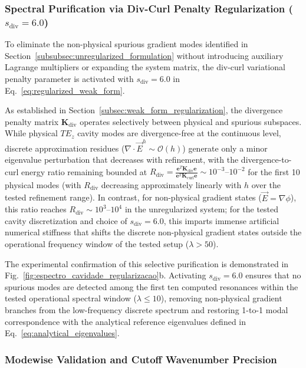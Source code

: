 \documentclass[preprint,12pt]{elsarticle}
\begin{document}
\subsubsection{Spectral Purification via Div-Curl Penalty Regularization (\texorpdfstring{$s_{\mathrm{div}} = 6.0$}{s(div) = 6.0})}
\label{subsubsec:regularized_formulation}

To eliminate the non-physical spurious gradient modes identified in Section~\ref{subsubsec:unregularized_formulation} without introducing auxiliary Lagrange multipliers or expanding the system matrix, the div-curl variational penalty parameter is activated with $s_{\mathrm{div}} = 6.0$ in Eq.~\eqref{eq:regularized_weak_form}.

As established in Section~\ref{subsec:weak_form_regularization}, the divergence penalty matrix $\mathbf{K}_{\mathrm{div}}$ operates selectively between physical and spurious subspaces. While physical $TE_z$ cavity modes are divergence-free at the continuous level, discrete approximation residues ($\nabla \cdot \vec{E}^h \sim \mathcal{O}(h)$) generate only a minor eigenvalue perturbation that decreases with refinement, with the divergence-to-curl energy ratio remaining bounded at $R_{\mathrm{div}} = \frac{\mathbf{e}^T \mathbf{K}_{\mathrm{div}} \mathbf{e}}{\mathbf{e}^T \mathbf{K}_{\mathrm{curl}} \mathbf{e}} \sim 10^{-3} \text{--} 10^{-2}$ for the first 10 physical modes (with $R_{\mathrm{div}}$ decreasing approximately linearly with $h$ over the tested refinement range). In contrast, for non-physical gradient states ($\vec{E} = \nabla \phi$), this ratio reaches $R_{\mathrm{div}} \sim 10^3 \text{--} 10^4$ in the unregularized system; for the tested cavity discretization and choice of $s_{\mathrm{div}} = 6.0$, this imparts immense artificial numerical stiffness that shifts the discrete non-physical gradient states outside the operational frequency window of the tested setup ($\lambda > 50$).

The experimental confirmation of this selective purification is demonstrated in Fig.~\ref{fig:espectro_cavidade_regularizacao}b. Activating $s_{\mathrm{div}} = 6.0$ ensures that no spurious modes are detected among the first ten computed resonances within the tested operational spectral window ($\lambda \le 10$), removing non-physical gradient branches from the low-frequency discrete spectrum and restoring 1-to-1 modal correspondence with the analytical reference eigenvalues defined in Eq.~\eqref{eq:analytical_eigenvalues}.

\subsubsection{Modewise Validation and Cutoff Wavenumber Precision}
\label{subsubsec:modewise_validation}
\end{document}
